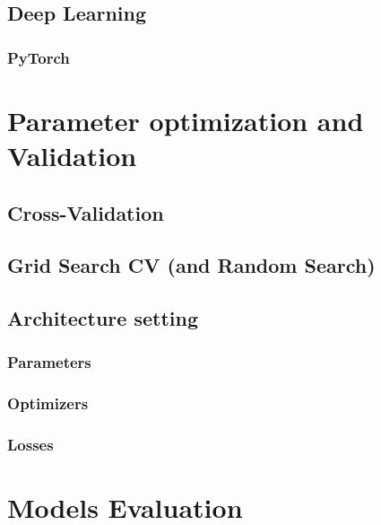 \documentclass{article}
\begin{document}
\subsection{Deep Learning}

\subsubsection{PyTorch}



\subsubsection{}


\section{Parameter optimization and Validation}

\subsection{Cross-Validation}

\subsection{Grid Search CV (and Random Search)}

\subsection{Architecture setting}

\subsubsection{Parameters}

\subsubsection{Optimizers}

\subsubsection{Losses}


\section{Models Evaluation}
\end{document}
